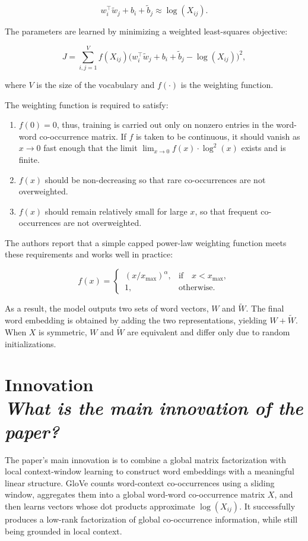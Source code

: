 \documentclass[10pt,a4paper]{article}
\begin{document}
\begin{equation}
    w_i^\top \tilde{w}_j + b_i + \tilde{b}_j \approx \log(X_{ij}). 
\end{equation}

The parameters are learned by minimizing a weighted least-squares objective:

\begin{equation}
    J=\sum_{i,j=1}^V f(X_{ij})\Big(w_i^\top \tilde{w}_j + b_i + \tilde{b}_j - \log(X_{ij})\Big)^2,
\end{equation}

where $V$ is the size of the vocabulary and $f(\cdot)$ is the weighting function.

The weighting function is required to satisfy:

\begin{enumerate}
    \item $f(0) = 0$, thus, training is carried out only on nonzero entries in the word-word co-occurrence matrix. If $f$ is taken to be continuous, it should vanish as $x \rightarrow 0$ fast enough that the limit \linebreak $\lim_{x \rightarrow 0} f(x) \cdot \log^2(x)$ exists and is finite.
    \item $f(x)$ should be non-decreasing so that rare co-occurrences are not overweighted.
    \item $f(x)$ should remain relatively small for large $x$, so that frequent co-occurrences are not overweighted.
\end{enumerate}

The authors report that a simple capped power-law weighting function meets these requirements and works well in practice:

\begin{equation}
    f(x)=
    \begin{cases}
    \, (x/x_{\max})^\alpha, & \text{if} \quad x < x_{\max},\\
    \, 1, & \text{otherwise}.
    \end{cases}
\end{equation}

As a result, the model outputs two sets of word vectors, $W$ and $\tilde{W}$. The final word embedding is obtained by adding the two representations, yielding $W + \tilde{W}$. When $X$ is symmetric, $W$ and $\tilde{W}$ are equivalent and differ only due to random initializations. 

\section{\textbf{Innovation} \\ \textit{What is the main innovation of the paper?}}
The paper's main innovation is to combine a global matrix factorization with local context-window learning to construct word embeddings with a meaningful linear structure. GloVe counts word-context co-occurrences using a sliding window, aggregates them into a global word-word co-occurrence matrix $X$, and then learns vectors whose dot products approximate $\log(X_{ij})$. It successfully produces a low-rank factorization of global co-occurrence information, while still being grounded in local context.
\end{document}
